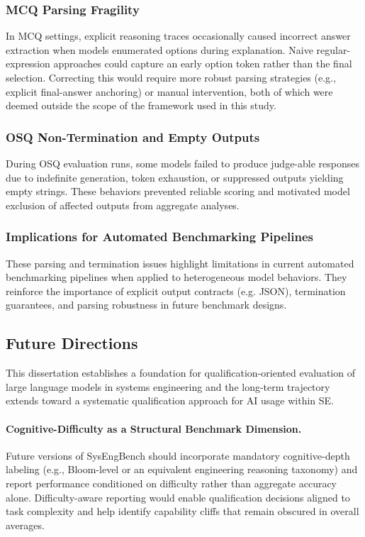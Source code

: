 \subsubsection{MCQ Parsing Fragility}

In MCQ settings, explicit reasoning traces occasionally caused incorrect answer extraction when models enumerated options during explanation. Naive regular-expression approaches could capture an early option token rather than the final selection. Correcting this would require more robust parsing strategies (e.g., explicit final-answer anchoring) or manual intervention, both of which were deemed outside the scope of the framework used in this study.

\subsubsection{OSQ Non-Termination and Empty Outputs}

During OSQ evaluation runs, some models failed to produce judge-able responses due to indefinite generation, token exhaustion, or suppressed outputs yielding empty strings. These behaviors prevented reliable scoring and motivated model exclusion of affected outputs from aggregate analyses.

\subsubsection{Implications for Automated Benchmarking Pipelines}

These parsing and termination issues highlight limitations in current automated benchmarking pipelines when applied to heterogeneous model behaviors. They reinforce the importance of explicit output contracts (e.g. JSON), termination guarantees, and parsing robustness in future benchmark designs.


\subsection{Future Directions}

This dissertation establishes a foundation for qualification-oriented evaluation of large language models in systems engineering and the long-term trajectory extends toward a systematic qualification approach for AI usage within SE.

\paragraph{Cognitive-Difficulty as a Structural Benchmark Dimension.}
Future versions of SysEngBench should incorporate mandatory cognitive-depth labeling (e.g., Bloom-level or an equivalent engineering reasoning taxonomy) and report performance conditioned on difficulty rather than aggregate accuracy alone. Difficulty-aware reporting would enable qualification decisions aligned to task complexity and help identify capability cliffs that remain obscured in overall averages.

